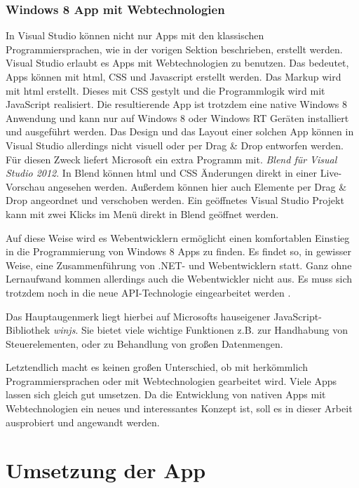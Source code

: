 \documentclass[12pt,a4paper,bibtotoc,abstracton]{scrartcl}
\begin{document}
\subsubsection{Windows 8 App mit Webtechnologien}
\label{subsubsec:webwin8}
In Visual Studio können nicht nur Apps mit den klassischen Programmiersprachen, wie in der vorigen Sektion beschrieben, erstellt werden. Visual Studio erlaubt es Apps mit Webtechnologien zu benutzen. Das bedeutet, Apps können mit \ac{html}, CSS und Javascript erstellt werden. Das Markup wird mit \ac{html} erstellt. Dieses mit CSS gestylt und die Programmlogik wird mit JavaScript realisiert. Die resultierende App ist trotzdem eine native Windows 8 Anwendung und kann nur auf Windows 8 oder Windows RT Geräten installiert und ausgeführt werden. Das Design und das Layout einer solchen App können in Visual Studio allerdings nicht visuell oder per Drag \& Drop entworfen werden. Für diesen Zweck liefert Microsoft ein extra Programm mit. \textit{Blend für Visual Studio 2012}. In Blend können \ac{html} und CSS Änderungen direkt in einer Live-Vorschau angesehen werden. Außerdem können hier auch Elemente per Drag \& Drop angeordnet und verschoben werden. Ein geöffnetes Visual Studio Projekt kann mit zwei Klicks im Menü direkt in Blend geöffnet werden. 

Auf diese Weise wird es Webentwicklern ermöglicht einen komfortablen Einstieg in die Programmierung von Windows 8 Apps zu finden. Es findet so, in gewisser Weise, eine Zusammenführung von .NET- und Webentwicklern statt. Ganz ohne Lernaufwand kommen allerdings auch die Webentwickler nicht aus. Es muss sich trotzdem noch in die neue API-Technologie eingearbeitet werden \citep{Bleske2012}.

Das Hauptaugenmerk liegt hierbei auf Microsofts hauseigener JavaScript-Bibliothek \textit{\ac{winjs}}. Sie bietet viele wichtige Funktionen z.B. zur Handhabung von Steuerelementen, oder zu Behandlung von großen Datenmengen. 

Letztendlich macht es keinen großen Unterschied, ob mit herkömmlich Programmiersprachen oder mit Webtechnologien gearbeitet wird. Viele Apps lassen sich gleich gut umsetzen. Da die Entwicklung von nativen Apps mit Webtechnologien ein neues und interessantes Konzept ist, soll es in dieser Arbeit ausprobiert und angewandt werden.

\newpage
\section{Umsetzung der App}
\label{sec:umsetzungderapp}
\end{document}
